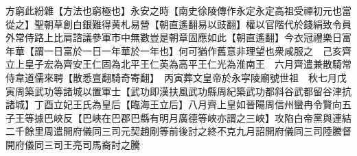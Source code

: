 方窮此紛雜【方法也窮極也】永安之時【南史徐陵傳作永定永定高祖受禪初元也當從之】聖朝草創白銀難得黄札易營【朝直遙翻易以豉翻】權以官階代於錢絹致令員外常侍路上比肩諮議參軍市中無數豈是朝章固應如此【朝直遙翻】今衣冠禮樂日富年華【謂一日富於一日一年華於一年也】何可猶作舊意非理望也衆咸服之　己亥齊立上皇子宏為齊安王仁固為北平王仁英為高平王仁光為淮南王　六月齊遣兼散騎常侍韋道儒來聘【散悉亶翻騎奇寄翻】　丙寅葬文皇帝於永寜陵廟號世祖　秋七月戊寅周築武功等諸城以置軍士【武功即漢扶風武功縣周紀築武功都斜谷武都留谷津抗諸城】丁酉立妃王氏為皇后【臨海王立后】八月齊上皇如晉陽周信州蠻冉令賢向五子王等據巴峽反【巴峽在巴郡巴縣有明月廣德等峽亦謂之三峽】攻陷白帝黨與連結二千餘里周遣開府儀同三司元契趙剛等前後討之終不克九月詔開府儀同三司陸騰督開府儀同三司王亮司馬裔討之騰